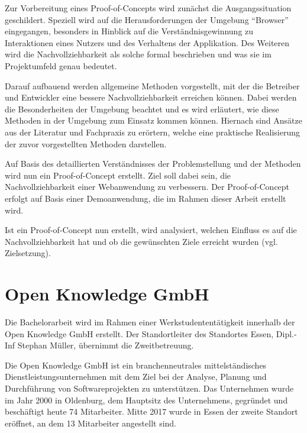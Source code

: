 \vspace{-0.5\baselineskip}

Zur Vorbereitung eines Proof-of-Concepts wird zunächst die Ausgangssituation geschildert. Speziell wird auf die Herausforderungen der Umgebung \enquote{Browser} eingegangen, besonders in Hinblick auf die Verständnisgewinnung zu Interaktionen eines Nutzers und des Verhaltens der Applikation. Des Weiteren wird die Nachvollziehbarkeit als solche formal beschrieben und was sie im Projektumfeld genau bedeutet.

Darauf aufbauend werden allgemeine Methoden vorgestellt, mit der die Betreiber und Entwickler eine bessere Nachvollziehbarkeit erreichen können. Dabei werden die Besonderheiten der Umgebung beachtet und es wird erläutert, wie diese Methoden in der Umgebung zum Einsatz kommen können. Hiernach sind Ansätze aus der Literatur und Fachpraxis zu erörtern, welche eine praktische Realisierung der zuvor vorgestellten Methoden darstellen.

Auf Basis des detaillierten Verständnisses der Problemstellung und der Methoden wird nun ein Proof-of-Concept erstellt. Ziel soll dabei sein, die Nachvollziehbarkeit einer Webanwendung zu verbessern. Der Proof-of-Concept erfolgt auf Basis einer Demoanwendung, die im Rahmen dieser Arbeit erstellt wird.

Ist ein Proof-of-Concept nun erstellt, wird analysiert, welchen Einfluss es auf die Nachvollziehbarkeit hat und ob die gewünschten Ziele erreicht wurden (vgl. Zielsetzung).

\vspace{-0.5\baselineskip}

\section{Open Knowledge GmbH}

\vspace{-0.5\baselineskip}


Die Bachelorarbeit wird im Rahmen einer Werkstudententätigkeit innerhalb der Open Knowledge GmbH erstellt. Der Standortleiter des Standortes Essen, Dipl.-Inf Stephan Müller, übernimmt die Zweitbetreuung.

Die Open Knowledge GmbH ist ein branchenneutrales mittelständisches Dienstleistungsunternehmen mit dem Ziel bei der Analyse, Planung und Durchführung von Softwareprojekten zu unterstützen. Das Unternehmen wurde im Jahr 2000 in Oldenburg, dem Hauptsitz des Unternehmens, gegründet und beschäftigt heute 74 Mitarbeiter. Mitte 2017 wurde in Essen der zweite Standort eröffnet, an dem 13 Mitarbeiter angestellt sind.

